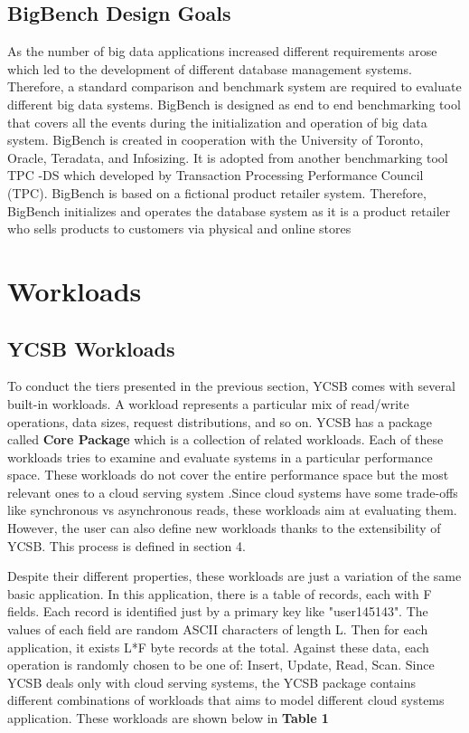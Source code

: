 \documentclass[sigconf,10pt]{acmart}
\begin{document}
\subsection{BigBench Design Goals}
As the number of big data applications increased different requirements arose which led to the development of different database management systems. Therefore, a standard comparison and benchmark system are required to evaluate different big data systems.  
\newline \newline
BigBench is designed as end to end benchmarking tool that covers all the events during the initialization and operation of big data system. 
\newline \newline
BigBench is created in cooperation with the University of Toronto, Oracle, Teradata, and Infosizing. It is adopted from another benchmarking tool TPC -DS which developed by Transaction Processing Performance Council (TPC)\cite{tpc}.
\newline \newline 
BigBench is based on a fictional product retailer system. Therefore, BigBench initializes and operates the database system as it is a product retailer  who sells products to customers via physical and online stores 

\section{Workloads}
\subsection{YCSB Workloads}
To conduct the tiers presented in the previous section, YCSB comes with several built-in workloads. A workload represents a particular mix of read/write operations, data sizes, request distributions, and so on. YCSB has a package called \textbf{Core Package} which is a collection of related workloads. Each of these workloads tries to examine and evaluate systems in a particular performance space. These workloads do not cover the entire performance space but the most relevant ones to a cloud serving system .Since cloud systems have some trade-offs like synchronous vs asynchronous reads, these workloads aim at evaluating them. However, the user can also define new workloads thanks to the extensibility of YCSB.  This process is defined in section 4. \newline
 
Despite their different properties, these workloads are just a variation of the same basic application. In this application, there is a table of records, each with F fields. Each record is identified just by a primary key like "user145143". The values of each field are random ASCII characters of length L. Then for each application, it exists L*F byte records at the total. 
 Against these data, each operation is randomly chosen to be one of: Insert, Update, Read, Scan.
Since YCSB deals only with cloud serving systems, the YCSB package contains different combinations of workloads that aims to model different cloud systems application. These workloads are shown below in \textbf{Table 1 }
\end{document}
